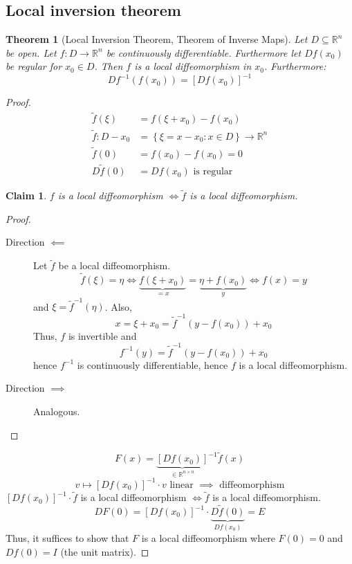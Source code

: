 \documentclass{article}
\newtheorem{theorem}{Theorem}  \numberwithin{theorem}{section}
\newtheorem*{claim}{Claim}%
\newcommand{\set}[1]{\left\{#1\right\}}
\begin{document}
\subsection{Local inversion theorem}
\begin{theorem}[Local Inversion Theorem, Theorem of Inverse Maps]
  \label{thm:lit}
  Let $D \subseteq \mathbb R^n$ be open. Let $f: D \to \mathbb R^n$ be continuously differentiable.
  Furthermore let $Df(x_0)$ be regular for $x_0 \in D$. Then $f$ is a local diffeomorphism in $x_0$.
  Furthermore:
  \[ Df^{-1}(f(x_0)) = [Df(x_0)]^{-1} \]
\end{theorem}
\begin{proof}
  \begin{align*}
    \tilde f(\xi) &= f(\xi + x_0) - f(x_0) \\
    \tilde f: D - x_0 &= \set{\xi = x - x_0: x \in D} \to \mathbb R^n \\
    \tilde f(0) &= f(x_0) - f(x_0) = 0 \\
    D\tilde f(0) &= Df(x_0) \text{ is regular}
  \end{align*}
  \begin{claim}
    $f$ is a local diffeomorphism $\iff \tilde f$ is a local diffeomorphism.
  \end{claim}
  
  \begin{proof}
    \begin{description}
      \item[Direction $\impliedby$]
	    Let $\tilde f$ be a local diffeomorphism.
	    \[ \tilde f(\xi) = \eta \iff \underbrace{f(\xi + x_0)}_{= x} = \underbrace{\eta + f(x_0)}_{y} \iff f(x) = y \]
	    and $\xi = \tilde f^{-1}(\eta)$. Also,
	    \[ x = \xi + x_0 = \tilde f^{-1}(y - f(x_0)) + x_0 \]
	    Thus, $f$ is invertible and
	    \[ f^{-1}(y) = \tilde f^{-1}(y - f(x_0)) + x_0 \]
	    hence $f^{-1}$ is continuously differentiable, hence $f$ is a local diffeomorphism.
	  \item[Direction $\implies$] Analogous.
    \end{description}
  \end{proof}
  \[ F(x) = {\underbrace{[Df(x_0)]}_{\in \mathbb R^{n \times n}}}^{-1} \tilde f(x) \]
  \[ v \mapsto [Df(x_0)]^{-1} \cdot v \text{ linear } \implies \text{ diffeomorphism} \]
  $[Df(x_0)]^{-1} \cdot \tilde f$ is a local diffeomorphism $\iff \tilde f$ is a local diffeomorphism.
  \[ DF(0) = [Df(x_0)]^{-1} \cdot \underbrace{D \tilde f(0)}_{Df(x_0)} = E \]
  Thus, it suffices to show that $F$ is a local diffeomorphism where $F(0) = 0$ and $Df(0) = I$ (the unit matrix).
  

\end{proof}
\end{document}
